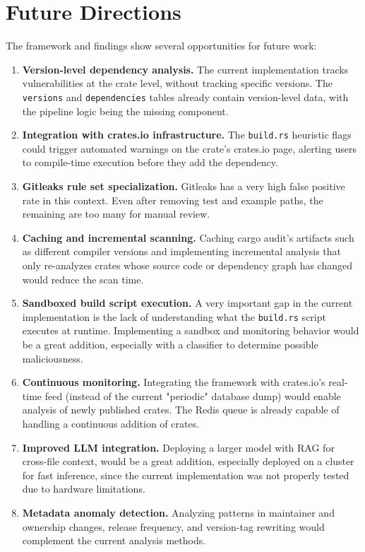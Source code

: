 \section{Future Directions}\label{sect:future-directions}

The framework and findings show several opportunities for future work:

\begin{enumerate}[leftmargin=*,itemsep=2pt]
\item \textbf{Version-level dependency analysis.} The current implementation tracks vulnerabilities at the crate level, without tracking specific versions. The \texttt{versions} and \texttt{dependencies} tables already contain version-level data, with the pipeline logic being the missing component.

\item \textbf{Integration with crates.io infrastructure.} The \texttt{build.rs} heuristic flags could trigger automated warnings on the crate's crates.io page, alerting users to compile-time execution before they add the dependency.

\item \textbf{Gitleaks rule set specialization.} 
Gitleaks has a very high false positive rate in this context. Even after removing test and example paths, the remaining are too many for manual review.

\item \textbf{Caching and incremental scanning.} Caching cargo audit's artifacts such as different compiler versions and implementing incremental analysis that only re-analyzes crates whose source code or dependency graph has changed would reduce the scan time.

\item \textbf{Sandboxed build script execution.} A very important gap in the current implementation is the lack of understanding what the \texttt{build.rs} script executes at runtime. Implementing a sandbox and monitoring behavior would be a great addition, especially with a classifier to determine possible maliciousness.

\item \textbf{Continuous monitoring.} Integrating the framework with crates.io's real-time feed (instead of the current "periodic" database dump) would enable analysis of newly published crates. The Redis queue is already capable of handling a continuous addition of crates.

\item \textbf{Improved LLM integration.} Deploying a larger model with RAG for cross-file context, would be a great addition, especially deployed on a cluster for fast inference, since the current implementation was not properly tested due to hardware limitations.

\item \textbf{Metadata anomaly detection.} Analyzing patterns in maintainer and ownership changes, release frequency, and version-tag rewriting would complement the current analysis methods.

\end{enumerate}

